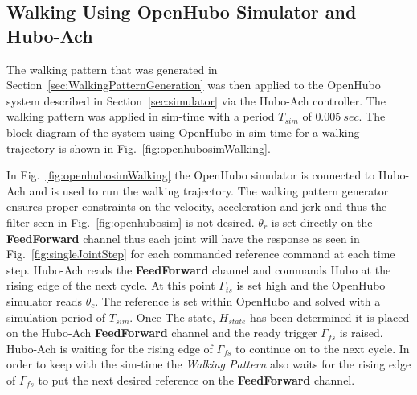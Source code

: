 \subsection{Walking Using OpenHubo Simulator and Hubo-Ach}\label{sec:OpenHuboWalking}
The walking pattern that was generated in Section~\ref{sec:WalkingPatternGeneration} was then applied to the OpenHubo system described in Section~\ref{sec:simulator} via the Hubo-Ach controller.
The walking pattern was applied in sim-time with a period $T_{sim}$ of $0.005~sec$.
The block diagram of the system using OpenHubo in sim-time for a walking trajectory is shown in Fig.~\ref{fig:openhubosimWalking}.



In Fig.~\ref{fig:openhubosimWalking} the OpenHubo simulator is connected to Hubo-Ach and is used to run the walking trajectory.  
The walking pattern generator ensures proper constraints on the velocity, acceleration and jerk and thus the filter seen in Fig.~\ref{fig:openhubosim} is not desired.  
$\theta_r$ is set directly on the \textbf{FeedForward} channel thus each joint will have the response as seen in Fig.~\ref{fig:singleJointStep} for each commanded reference command at each time step.
Hubo-Ach reads the \textbf{FeedForward} channel and commands Hubo at the rising edge of the next cycle.  
At this point $\Gamma_{ts}$ is set high and the OpenHubo simulator reads $\theta_c$.  
The reference is set within OpenHubo and solved with a simulation period of $T_{sim}$.  
Once The state, $H_{state}$ has been determined it is placed on the Hubo-Ach \textbf{FeedForward} channel and the ready trigger $\Gamma_{fs}$ is raised.  
Hubo-Ach is waiting for the rising edge of $\Gamma_{fs}$ to continue on to the next cycle.  
In order to keep with the sim-time the \textit{Walking Pattern} also waits for the rising edge of $\Gamma_{fs}$ to put the next desired reference on the \textbf{FeedForward} channel.




